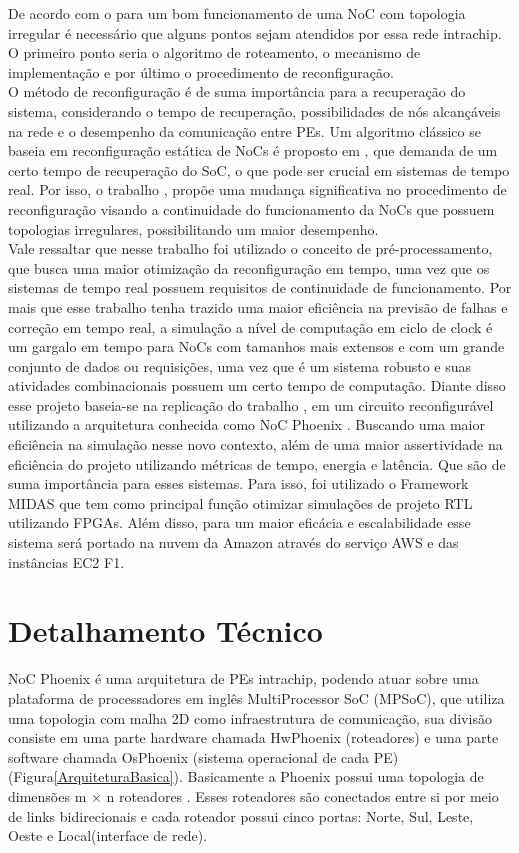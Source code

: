 \documentclass[conference]{IEEEtran}
\begin{document}
	De acordo com o \cite{b5} para um bom funcionamento de uma NoC com topologia irregular é necessário que alguns pontos sejam atendidos por essa rede intrachip. O primeiro ponto seria o algoritmo de roteamento, o   mecanismo de implementação e por último o procedimento de reconfiguração.\\
	O método de reconfiguração é de suma importância para a recuperação do sistema, considerando o tempo de recuperação, possibilidades de nós alcançáveis na rede e o desempenho da comunicação entre PEs. Um algoritmo clássico se baseia em reconfiguração estática de NoCs é proposto em \cite{b6}, que demanda de um certo tempo de recuperação do SoC, o que pode ser
	crucial em sistemas de tempo real.
	Por isso, o trabalho \cite{b5}, propõe uma mudança significativa no procedimento de reconfiguração visando a continuidade do funcionamento da NoCs que possuem topologias irregulares, possibilitando um maior desempenho. \\
	Vale ressaltar que nesse trabalho foi utilizado o conceito de pré-processamento, que busca uma maior otimização da reconfiguração em tempo, uma vez que os sistemas de tempo real possuem requisitos de continuidade de funcionamento. Por mais que esse trabalho tenha trazido uma maior eficiência na previsão de falhas e correção em tempo real, a simulação a nível de computação em ciclo de clock é um gargalo em tempo para NoCs com tamanhos mais extensos e com um grande conjunto de dados ou requisições, uma vez que é um sistema robusto e suas atividades combinacionais possuem um certo tempo de computação. 
	Diante disso esse projeto baseia-se na replicação do trabalho \cite{b5}, em um circuito reconfigurável utilizando a  arquitetura conhecida como NoC Phoenix \cite{b7}. Buscando uma maior eficiência na simulação nesse novo contexto, além de uma maior assertividade na eficiência do projeto utilizando métricas de tempo, energia e latência. Que são de suma importância para esses sistemas. Para isso, foi utilizado o Framework MIDAS que tem como principal função otimizar simulações de projeto RTL utilizando FPGAs. Além disso, para um maior eficácia e escalabilidade esse sistema será portado na nuvem da Amazon através do serviço AWS e das instâncias EC2 F1.      
	
	
	
	
	
	\section{Detalhamento Técnico}
	NoC Phoenix \cite{b7} é uma arquitetura de PEs intrachip, podendo atuar sobre uma plataforma de processadores em inglês MultiProcessor SoC (MPSoC), que utiliza uma topologia com malha 2D como infraestrutura de comunicação, sua divisão consiste em uma parte hardware chamada HwPhoenix (roteadores) e uma parte software chamada OsPhoenix (sistema operacional de cada PE)  (Figura\ref{ArquiteturaBasica}). Basicamente a Phoenix possui uma topologia de  dimensões m × n roteadores . Esses roteadores são conectados entre si por meio de links bidirecionais e cada
	roteador possui cinco portas: Norte, Sul, Leste, Oeste e Local(interface de rede).\\
	
\end{document}
